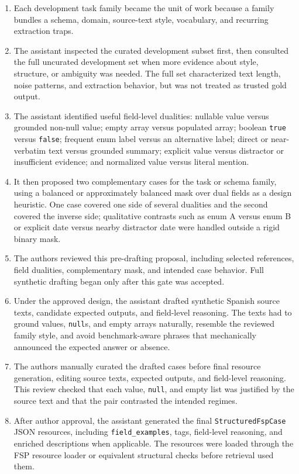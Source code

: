 \begin{enumerate}
\item Each development task family became the unit of work because a family bundles a schema, domain, source-text style, vocabulary, and recurring extraction traps.
\item The assistant inspected the curated development subset first, then consulted the full uncurated development set when more evidence about style, structure, or ambiguity was needed. The full set characterized text length, noise patterns, and extraction behavior, but was not treated as trusted gold output.
\item The assistant identified useful field-level dualities: nullable value versus grounded non-null value; empty array versus populated array; boolean \texttt{true} versus \texttt{false}; frequent enum label versus an alternative label; direct or near-verbatim text versus grounded summary; explicit value versus distractor or insufficient evidence; and normalized value versus literal mention.
\item It then proposed two complementary cases for the task or schema family, using a balanced or approximately balanced mask over dual fields as a design heuristic. One case covered one side of several dualities and the second covered the inverse side; qualitative contrasts such as enum A versus enum B or explicit date versus nearby distractor date were handled outside a rigid binary mask.
\item The authors reviewed this pre-drafting proposal, including selected references, field dualities, complementary mask, and intended case behavior. Full synthetic drafting began only after this gate was accepted.
\item Under the approved design, the assistant drafted synthetic Spanish source texts, candidate expected outputs, and field-level reasoning. The texts had to ground values, \texttt{null}s, and empty arrays naturally, resemble the reviewed family style, and avoid benchmark-aware phrases that mechanically announced the expected answer or absence.
\item The authors manually curated the drafted cases before final resource generation, editing source texts, expected outputs, and field-level reasoning. This review checked that each value, \texttt{null}, and empty list was justified by the source text and that the pair contrasted the intended regimes.
\item After author approval, the assistant generated the final \texttt{StructuredFspCase} JSON resources, including \texttt{field\_examples}, tags, field-level reasoning, and enriched descriptions when applicable. The resources were loaded through the FSP resource loader or equivalent structural checks before retrieval used them.
\end{enumerate}
